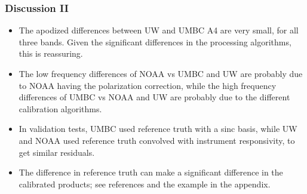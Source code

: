 \begin{frame}
\frametitle{Discussion II}
\begin{itemize}

  \item The apodized differences between UW and UMBC A4 are very
    small, for all three bands.  Given the significant differences in
    the processing algorithms, this is reassuring.

  \item The low frequency differences of NOAA vs UMBC and UW are
    probably due to NOAA having the polarization correction, while the
    high frequency differences of UMBC vs NOAA and UW are probably due
    to the different calibration algorithms.

  \item In validation tests, UMBC used reference truth with a sinc
    basis, while UW and NOAA used reference truth convolved with
    instrument responsivity, to get similar residuals.

  \item The difference in reference truth can make a significant
    difference in the calibrated products; see references and the
    example in the appendix.

\end{itemize}
\end{frame}
